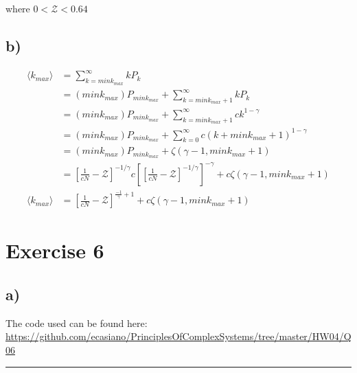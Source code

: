\documentclass{article}
\begin{document}
where $0 < \mathcal{Z} < 0.64$

\subsection{b)}

\begin{align}
\langle k_{max} \rangle &= \sum_{k = mink_{max}}^{\infty} k P_k \\
&= (mink_{max}) P_{mink_{max}} + \sum_{k = mink_{max} + 1}^{\infty} k P_k \\
&= (mink_{max}) P_{mink_{max}} + \sum_{k = mink_{max} + 1}^{\infty} c k^{1-\gamma} \\
&= (mink_{max}) P_{mink_{max}} + \sum_{k = 0}^{\infty} c (k + mink_{max}+1)^{1-\gamma} \\
&= (mink_{max}) P_{mink_{max}} + \zeta(\gamma - 1, mink_{max}+1) \\
&=  [\frac{1}{cN} - \mathcal{Z}]^{-1/\gamma} c[  [\frac{1}{cN} - \mathcal{Z}]^{-1/\gamma} ] ^{-\gamma} + c \zeta(\gamma - 1, mink_{max}+1) \\
\langle k_{max} \rangle &=  [\frac{1}{cN} - \mathcal{Z}]^{\frac{-1}{\gamma} + 1} + c \zeta(\gamma - 1, mink_{max}+1)
\end{align}


\section{Exercise 6}

\subsection{a)}

The code used can be found here: \url{https://github.com/ecasiano/PrinciplesOfComplexSystems/tree/master/HW04/Q06}

\hrule %
\end{document}
